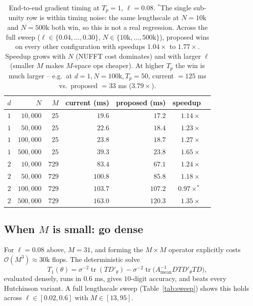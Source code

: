 \documentclass[11pt]{article}
\newcommand{\tr}{\operatorname{tr}}
\newcommand{\bigo}{\mathcal{O}}
\begin{document}
\begin{table}[h]
\centering
\begin{tabular}{rrrrrrr}
\toprule
$d$ & $N$ & $M$ & current (ms) & proposed (ms) & speedup \\
\midrule
$1$ & $10{,}000$  & $25$   & $19.6$  & $17.2$  & $1.14\times$ \\
$1$ & $50{,}000$  & $25$   & $22.6$  & $18.4$  & $1.23\times$ \\
$1$ & $100{,}000$ & $25$   & $23.8$  & $18.7$  & $1.27\times$ \\
$1$ & $500{,}000$ & $25$   & $39.3$  & $23.8$  & $1.65\times$ \\
$2$ & $10{,}000$  & $729$  & $83.4$  & $67.1$  & $1.24\times$ \\
$2$ & $50{,}000$  & $729$  & $100.8$ & $85.8$  & $1.18\times$ \\
$2$ & $100{,}000$ & $729$  & $103.7$ & $107.2$ & $0.97\times^{*}$ \\
$2$ & $500{,}000$ & $729$  & $163.0$ & $120.3$ & $1.35\times$ \\
\bottomrule
\end{tabular}
\caption{End-to-end gradient timing at $T_p=1$, $\ell=0.08$. $^{*}$The single sub-unity row is within timing noise: the same lengthscale at $N=10$k and $N=500$k both win, so this is not a real regression. Across the full sweep ($\ell\in\{0.04,\ldots,0.30\}$, $N\in\{10$k$,\ldots,500$k$\}$), proposed wins on every other configuration with speedups $1.04\times$ to $1.77\times$. Speedup grows with $N$ (NUFFT cost dominates) and with larger $\ell$ (smaller $M$ makes $M$-space ops cheaper). At higher $T_p$ the win is much larger -- e.g.\ at $d=1, N=100$k$, T_p=50$, current $=125$ ms vs.\ proposed $=33$ ms ($\mathbf{3.79\times}$).}
\end{table}

\subsection{When $M$ is small: go dense}
\label{sec:dense}

For $\ell = 0.08$ above, $M=31$, and forming the $M\times M$ operator explicitly costs $\bigo(M^3)\approx\!30\text{k}$ flops. The deterministic solve
\begin{equation}
  T_1(\theta) = \sigma^{-2}\tr(TD'_\theta) - \sigma^{-2}\tr\!\bigl(A_{\text{mean}}^{-1}DTD'_\theta TD\bigr),
\end{equation}
evaluated densely, runs in $0.6$ ms, gives $10$-digit accuracy, and beats every Hutchinson variant. A full lengthscale sweep (Table~\ref{tab:sweep}) shows this holds across $\ell\in[0.02, 0.6]$ with $M\in[13, 95]$.
\end{document}
